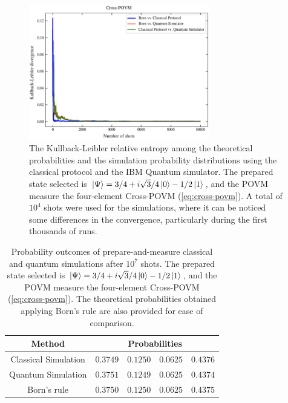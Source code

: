 \begin{figure}[h!]
\centering
\includegraphics[width=0.7\textwidth]{images/pm_povm_kl_bcq.png}
\caption{The Kullback-Leibler relative entropy among the theoretical probabilities and the simulation probability distributions using the classical protocol and the IBM Quantum simulator. The prepared state selected is $\ket{\Psi}=3/4 + i \sqrt{3}/4 \ket{0} - 1/2 \ket{1}$, and the POVM measure the four-element Cross-POVM (\ref{eq:cross-povm}). A total of $10^4$ shots were used for the simulations, where it can be noticed some differences in the convergence, particularly during the first thousands of runs.}
\label{fig:classical_quantum_results_kl}
\end{figure}

\begin{table}[h!]
\centering
{\renewcommand{\arraystretch}{1.2}%
\begin{tabular}{c c c c c} 
 \toprule
 Method & \multicolumn{4}{c}{Probabilities}  \\ \hline
 Classical Simulation   & $\scriptstyle0.3749$ 
                        & $\scriptstyle0.1250$ 
                        & $\scriptstyle0.0625$ 
                        & $\scriptstyle0.4376$ \\ 
 Quantum Simulation     & $\scriptstyle0.3751$ 
                        & $\scriptstyle0.1249$ 
                        & $\scriptstyle0.0625$ 
                        & $\scriptstyle0.4374$ \\ 
 Born's rule            & $\scriptstyle0.3750$ 
                        & $\scriptstyle0.1250$ 
                        & $\scriptstyle0.0625$ 
                        & $\scriptstyle0.4375$ \\ 
 \bottomrule
\end{tabular}}
\caption{Probability outcomes of prepare-and-measure classical and quantum simulations after $10^{7}$ shots. The prepared state selected is $\ket{\Psi}=3/4 + i \sqrt{3}/4 \ket{0} - 1/2 \ket{1}$, and the POVM measure the four-element Cross-POVM (\ref{eq:cross-povm}). The theoretical probabilities obtained applying Born’s rule are also
provided for ease of comparison.}
\label{table:classical_quantum_results}
\end{table}

